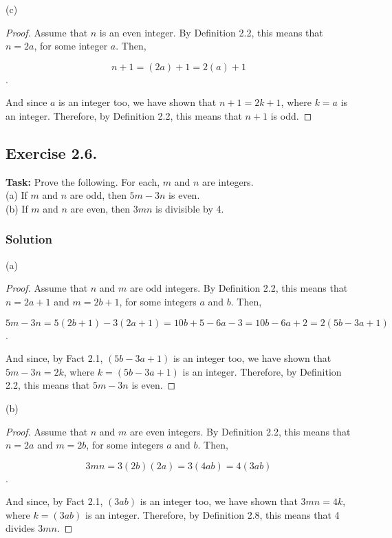 \documentclass{article}
\begin{document}
\noindent (c)

\begin{proof}
     Assume that $n$ is an even integer. By Definition 2.2, this means that $n=2a$, for some integer $a$. Then,

    \[n+1=(2a)+1=2(a)+1\].

    And since $a$ is an integer too, we have shown that $n+1=2k+1$, where $k=a$ is an integer. Therefore, by Definition 2.2, this means that $n+1$ is odd. 
\end{proof}

\subsection{Exercise 2.6.} 
\textbf{Task:} Prove the following. For each, $m$ and $n$ are integers.\\
(a) If $m$ and $n$ are odd, then $5m-3n$ is even.\\
(b) If $m$ and $n$ are even, then $3mn$ is divisible by 4.

\subsubsection*{Solution}

(a)

\begin{proof}
    Assume that $n$ and $m$ are odd integers. By Definition 2.2, this means that $n=2a+1$ and $m=2b+1$, for some integers $a$ and $b$. Then,

    \[5m-3n=5(2b+1)-3(2a+1)=10b+5-6a-3=10b-6a+2=2(5b-3a+1)\].

    And since, by Fact 2.1, $(5b-3a+1)$ is an integer too, we have shown that $5m-3n=2k$, where $k=(5b-3a+1)$ is an integer. Therefore, by Definition 2.2, this means that $5m-3n$ is even.
\end{proof}

\newpage

\noindent (b)

\begin{proof}
     Assume that $n$ and $m$ are even integers. By Definition 2.2, this means that $n=2a$ and $m=2b$, for some integers $a$ and $b$. Then,

     \[3mn=3(2b)(2a)=3(4ab)=4(3ab)\].

     And since, by Fact 2.1, $(3ab)$ is an integer too, we have shown that $3mn=4k$, where $k=(3ab)$ is an integer. Therefore, by Definition 2.8, this means that 4 divides $3mn$.
\end{proof}
\end{document}
